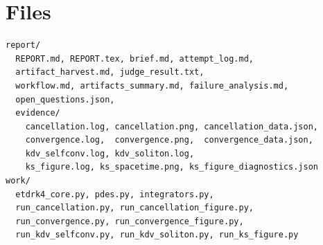 \documentclass[11pt]{article}
\begin{document}
\section{Files}
\begin{lstlisting}[basicstyle=\ttfamily\small]
report/
  REPORT.md, REPORT.tex, brief.md, attempt_log.md,
  artifact_harvest.md, judge_result.txt,
  workflow.md, artifacts_summary.md, failure_analysis.md,
  open_questions.json,
  evidence/
    cancellation.log, cancellation.png, cancellation_data.json,
    convergence.log,  convergence.png,  convergence_data.json,
    kdv_selfconv.log, kdv_soliton.log,
    ks_figure.log, ks_spacetime.png, ks_figure_diagnostics.json
work/
  etdrk4_core.py, pdes.py, integrators.py,
  run_cancellation.py, run_cancellation_figure.py,
  run_convergence.py, run_convergence_figure.py,
  run_kdv_selfconv.py, run_kdv_soliton.py, run_ks_figure.py
\end{lstlisting}
\end{document}
